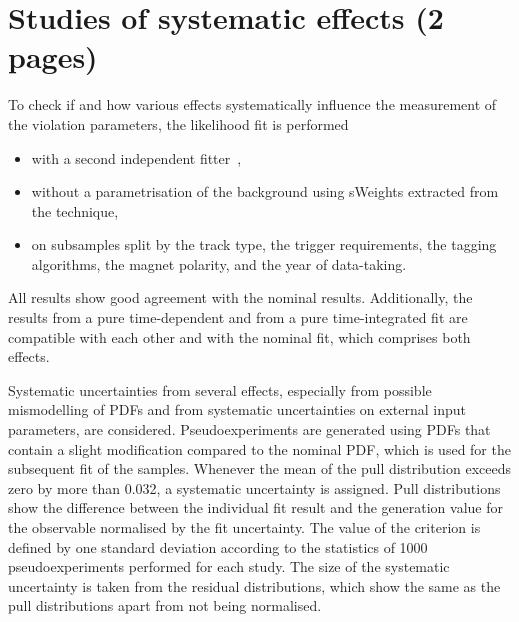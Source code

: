 
\section{Studies of systematic effects (2 pages)}
\label{sec:bd2jpsiks:systematics}

To check if and how various effects systematically influence the measurement
of the \CP violation parameters, the likelihood fit is performed
\begin{itemize}
    \item with a second independent fitter~\cite{Cauet-PhDThesis},
    \item without a parametrisation of the background using sWeights extracted
    from the \sPlot technique,
    \item  on subsamples split by the \KS track type, the trigger
    requirements, the tagging algorithms, the magnet polarity, and the year of
    data-taking.
\end{itemize}
All results show good agreement with the nominal results. Additionally, the
results from a pure time-dependent and from a pure time-integrated fit are
compatible with each other and with the nominal fit, which comprises both
effects.

Systematic uncertainties from several effects, especially from possible
mismodelling of PDFs and from systematic uncertainties on external input
parameters, are considered. Pseudoexperiments are generated using PDFs that
contain a slight modification compared to the nominal PDF, which is used for
the subsequent fit of the samples. Whenever the mean of the pull distribution
exceeds zero by more than \num{0.032}, a systematic uncertainty is assigned.
Pull distributions show the difference between the individual fit result and
the generation value for the \CP observable normalised by the fit uncertainty.
The value of the criterion is defined by one standard deviation according to
the statistics of \num{1000} pseudoexperiments performed for each study. The
size of the systematic uncertainty is taken from the residual distributions,
which show the same as the pull distributions apart from not being normalised.


